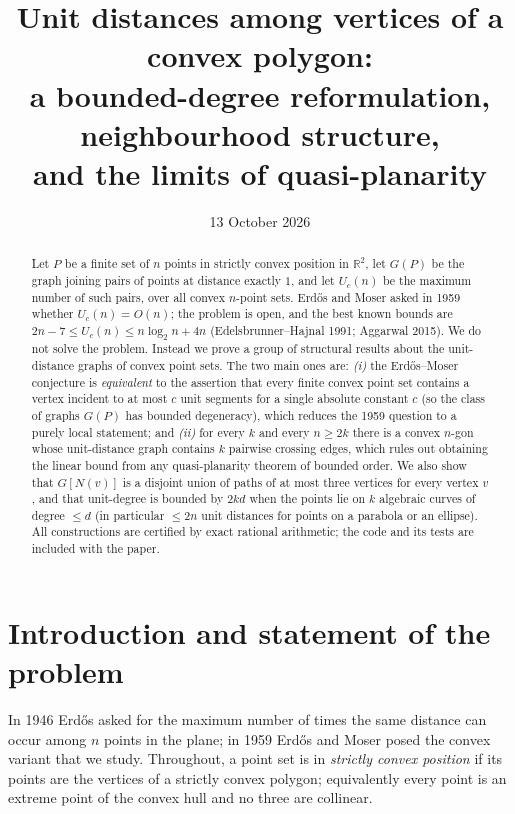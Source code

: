 \documentclass[11pt]{article}
\title{\textbf{Unit distances among vertices of a convex polygon:\\
a bounded-degree reformulation, neighbourhood structure,\\
and the limits of quasi-planarity}}
\author{}
\date{13 October 2026}
\theoremstyle{definition}
\theoremstyle{remark}
\newcommand{\R}{\mathbb{R}}
\newcommand{\UC}{U_c}
\begin{document}
\maketitle

\begin{abstract}
Let $P$ be a finite set of $n$ points in strictly convex position in $\R^2$, let
$G(P)$ be the graph joining pairs of points at distance exactly $1$, and let
$\UC(n)$ be the maximum number of such pairs, over all convex $n$-point sets.
Erd\H{o}s and Moser asked in 1959 whether $\UC(n)=O(n)$; the problem is open, and the
best known bounds are $2n-7 \le \UC(n) \le n\log_2 n + 4n$
(Edelsbrunner--Hajnal 1991; Aggarwal 2015).  We do not solve the problem.  Instead we
prove a group of structural results about the unit-distance graphs of convex point
sets.  The two main ones are: \emph{(i)} the Erd\H{o}s--Moser conjecture is
\emph{equivalent} to the assertion that every finite convex point set contains a
vertex incident to at most $c$ unit segments for a single absolute constant $c$ (so
the class of graphs $G(P)$ has bounded degeneracy), which reduces the 1959 question
to a purely local statement; and \emph{(ii)} for every $k$ and every $n\ge 2k$ there
is a convex $n$-gon whose unit-distance graph contains $k$ pairwise crossing edges,
which rules out obtaining the linear bound from any quasi-planarity theorem of
bounded order.  We also show that $G[N(v)]$ is a disjoint union of paths of at most
three vertices for every vertex $v$, and that unit-degree is bounded by $2kd$ when the
points lie on $k$ algebraic curves of degree $\le d$ (in particular $\le 2n$ unit
distances for points on a parabola or an ellipse).  All constructions are certified
by exact rational arithmetic; the code and its tests are included with the paper.
\end{abstract}

\section{Introduction and statement of the problem}

In 1946 Erd\H{o}s asked for the maximum number of times the same distance can occur
among $n$ points in the plane; in 1959 Erd\H{o}s and Moser \cite{ErdosMoser1959}
posed the convex variant that we study.  Throughout, a point set is in
\emph{strictly convex position} if its points are the vertices of a strictly convex
polygon; equivalently every point is an extreme point of the convex hull and no three
are collinear.
\end{document}
